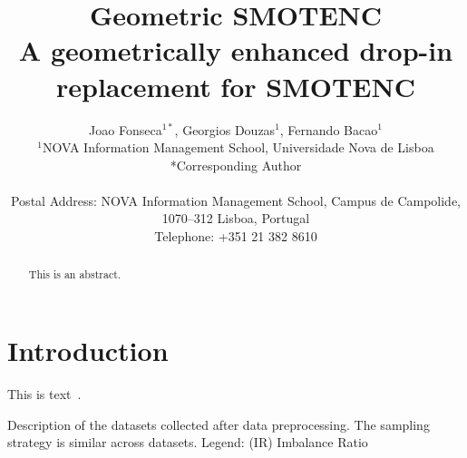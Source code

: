 \documentclass[parskip=full]{scrartcl}
\title{Geometric SMOTENC \\ \LARGE{A geometrically enhanced drop-in
replacement for SMOTENC}}
\author{%
	Joao Fonseca\(^{1*}\), Georgios Douzas\(^{1}\), Fernando Bacao\(^{1}\)
	\\
	\small{\(^{1}\)NOVA Information Management School, Universidade Nova de Lisboa}
	\\
	\small{*Corresponding Author}
	\\
	\\
	\small{Postal Address: NOVA Information Management School, Campus de
    Campolide, 1070--312 Lisboa, Portugal}
	\\
	\small{Telephone: +351 21 382 8610}
}
\date{}
\begin{document}
\maketitle

\begin{abstract}
    This is an abstract.
\end{abstract}

\section{Introduction}

This is text~\cite{Chawla2002}.


 \begin{table}
     \centering
     \caption{\label{tab:datasets_description}
         Description of the datasets collected after data preprocessing. The
         sampling strategy is similar across datasets. Legend: (IR) Imbalance
         Ratio
     }
\end{table}



\end{document}
